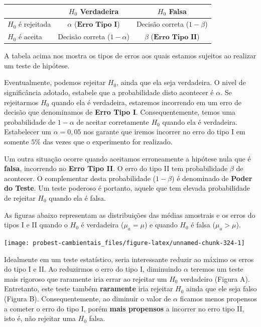\documentclass[
]{book}
\begin{document}
\begin{longtable}[]{@{}lcc@{}}
\toprule
& \(H_0\) Verdadeira & \(H_0\) Falsa \\
\midrule
\endhead
\(H_0\) é rejeitada & \(\alpha\) (\(\textbf{Erro Tipo I}\)) & Decisão correta (\(1-\beta\)) \\
\(H_0\) é aceita & Decisão correta (\(1-\alpha\)) & \(\beta\) (\(\textbf{Erro Tipo II}\)) \\
\bottomrule
\end{longtable}

A tabela acima nos mostra os tipos de erros aos quais estamos sujeitos ao realizar um teste de hipótese.

Eventualmente, podemos rejeitar \(H_0\), ainda que ela seja verdadeira. O nivel de significância adotado, estabele que a probabilidade disto acontecer é \(\alpha\). Se rejeitarmos \(H_0\) quando ela é verdadeira, estaremos incorrendo em um erro de decisão que denominamos de \textbf{Erro Tipo I}. Consequentemente, temos uma probabilidade de \(1 - \alpha\) de aceitar corretamente \(H_0\) quando ela é verdadeira. Estabelecer um \(\alpha = 0,05\) nos garante que iremos incorrer no erro do tipo I em somente \(5\%\) das vezes que o experimento for realizado.

Um outra situação ocorre quando aceitamos erroneamente a hipótese nula que é \textbf{falsa}, incorrendo no \textbf{Erro Tipo II}. O erro do tipo II tem probabilidade \(\beta\) de acontecer. O complementar desta probabilidade (\(1-\beta\)) é denominado de \textbf{Poder do Teste}. Um teste poderoso é portanto, aquele que tem elevada probabilidade de rejeitar \(H_0\) quando ela é falsa.

As figuras abaixo representam as distribuições das médias amostrais e os erros do tipos I e II quando o \(H_0\) é verdadeira (\(\mu_a = \mu\)) e quando \(H_0\) é falsa (\(\mu_a > \mu\)).

\begin{center}\texttt{[image: probest-cambientais\_files/figure-latex/unnamed-chunk-324-1]} \end{center}

Idealmente em um teste estatístico, seria interessante reduzir ao máximo os erros do tipo I e II. Ao reduzirmos o erro do tipo I, diminuindo \(\alpha\) teremos um teste mais rigoroso que raramente iria errar ao rejeitar um \(H_0\) verdadeiro (Figura A). Entretanto, este teste também \textbf{raramente} iria rejeitar \(H_0\) ainda que ele seja falso (Figura B). Consequentemente, ao diminuir o valor de \(\alpha\) ficamos menos propensos a cometer o erro do tipo I, porém \textbf{mais propensos} a incorrer no erro tipo II, isto é, não rejeitar uma \(H_0\) falsa.
\end{document}
